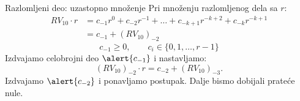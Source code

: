 \begin{frame}[label=04-s010]{Razlomljeni deo: uzastopno množenje}
\setlength{\abovedisplayskip}{3pt}\setlength{\belowdisplayskip}{3pt}
Pri množenju razlomljenog dela sa $r$:
\[\begin{aligned}RV_{10}\cdot r&=c_{-1}r^0+c_{-2}r^{-1}+\ldots+c_{-k+1}r^{-k+2}+c_{-k}r^{-k+1}\\&=c_{-1}+(RV_{10})_{-2}\end{aligned}\]
\[c_{-1}\geq0,\qquad c_i\in\{0,1,\ldots,r-1\}\]
Izdvajamo celobrojni deo $\alert{c_{-1}}$ i nastavljamo:
\[(RV_{10})_{-2}\cdot r=c_{-2}+(RV_{10})_{-3}.\]
Izdvajamo $\alert{c_{-2}}$ i ponavljamo postupak.
Dalje bismo dobijali prateće nule.
\end{frame}
